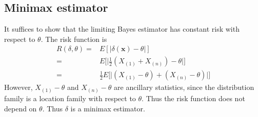 \documentclass[12pt]{article}
\begin{document}
\subsection{Minimax estimator}
It suffices to show that the limiting Bayes estimator has constant risk with respect to $\theta$.
The risk function is
\begin{align*}
  R(\delta, \theta)
  = & E[|\delta(\bm{x}) - \theta|] \\
  = & E\Big[\big|\frac{1}{2}(X_{(1)} + X_{(n)}) - \theta\big|\Big] \\
  = & \frac{1}{2}E\Big[\big|(X_{(1)} - \theta) + (X_{(n)} - \theta)\big|\Big] 
\end{align*}
However, $X_{(1)} - \theta$ and $X_{(n)} - \theta$ are ancillary statistics,
since the distribution family is a location family with respect to $\theta$.
Thus the risk function does not depend on $\theta$.
Thus $\delta$ is a minimax estimator.
\end{document}
